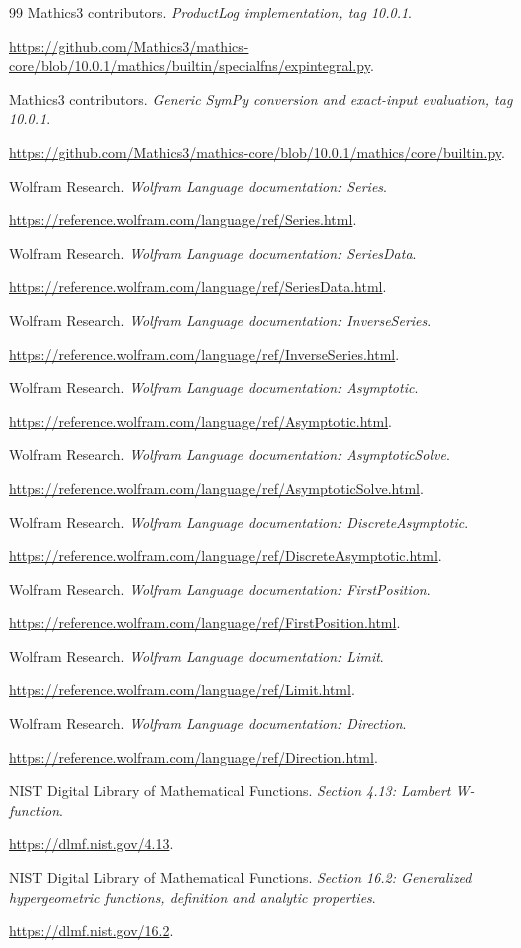 \documentclass[11pt,letterpaper]{article}
\begin{document}
\begin{thebibliography}{99}
Mathics3 contributors. \emph{ProductLog implementation, tag 10.0.1}.\par
\url{https://github.com/Mathics3/mathics-core/blob/10.0.1/mathics/builtin/specialfns/expintegral.py}.

Mathics3 contributors. \emph{Generic SymPy conversion and exact-input evaluation, tag 10.0.1}.\par
\url{https://github.com/Mathics3/mathics-core/blob/10.0.1/mathics/core/builtin.py}.

Wolfram Research. \emph{Wolfram Language documentation: Series}.\par
\url{https://reference.wolfram.com/language/ref/Series.html}.

Wolfram Research. \emph{Wolfram Language documentation: SeriesData}.\par
\url{https://reference.wolfram.com/language/ref/SeriesData.html}.

Wolfram Research. \emph{Wolfram Language documentation: InverseSeries}.\par
\url{https://reference.wolfram.com/language/ref/InverseSeries.html}.

Wolfram Research. \emph{Wolfram Language documentation: Asymptotic}.\par
\url{https://reference.wolfram.com/language/ref/Asymptotic.html}.

Wolfram Research. \emph{Wolfram Language documentation: AsymptoticSolve}.\par
\url{https://reference.wolfram.com/language/ref/AsymptoticSolve.html}.

Wolfram Research. \emph{Wolfram Language documentation: DiscreteAsymptotic}.\par
\url{https://reference.wolfram.com/language/ref/DiscreteAsymptotic.html}.

Wolfram Research. \emph{Wolfram Language documentation: FirstPosition}.\par
\url{https://reference.wolfram.com/language/ref/FirstPosition.html}.

Wolfram Research. \emph{Wolfram Language documentation: Limit}.\par
\url{https://reference.wolfram.com/language/ref/Limit.html}.

Wolfram Research. \emph{Wolfram Language documentation: Direction}.\par
\url{https://reference.wolfram.com/language/ref/Direction.html}.

NIST Digital Library of Mathematical Functions. \emph{Section 4.13: Lambert W-function}.\par
\url{https://dlmf.nist.gov/4.13}.

NIST Digital Library of Mathematical Functions. \emph{Section 16.2: Generalized hypergeometric functions, definition and analytic properties}.\par
\url{https://dlmf.nist.gov/16.2}.

\end{thebibliography}
\end{document}
